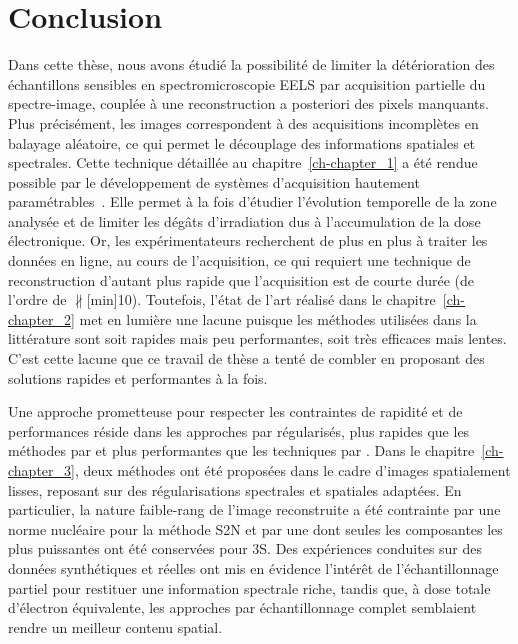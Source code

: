 \chapter*{Conclusion}\label{chap-conclusion}

Dans cette thèse, nous avons étudié la possibilité de limiter la détérioration des échantillons sensibles en spectromicroscopie EELS par acquisition partielle du spectre-image, couplée à une reconstruction a posteriori des pixels manquants. 
%
Plus précisément, les images correspondent à des acquisitions incomplètes en balayage aléatoire, ce qui permet le découplage des informations spatiales et spectrales.
%
Cette technique détaillée au chapitre~\ref{ch-chapter_1} a été rendue possible par le développement de systèmes d'acquisition hautement paramétrables~\cite{tararan2016random, zobelli2019spatial, tence2019following}. Elle permet à la fois d'étudier l'évolution temporelle de la zone analysée et de limiter les dégâts d'irradiation dus à l'accumulation de la dose électronique.
%
Or, les expérimentateurs recherchent de plus en plus à traiter les données en ligne, \ie{} au cours de l'acquisition, ce qui requiert une technique de reconstruction d'autant plus rapide que l'acquisition est de courte durée (de l'ordre de $\nparallel$[min]{10}). Toutefois, l'état de l'art réalisé dans le chapitre~\ref{ch-chapter_2} met en lumière une lacune puisque les méthodes utilisées dans la littérature sont soit rapides mais peu performantes, soit très efficaces mais lentes. C'est cette lacune que ce travail de thèse a tenté de combler en proposant des solutions rapides et performantes à la fois.

Une approche prometteuse pour respecter les contraintes de rapidité et de performances réside dans les approches par  régularisés, plus rapides que les méthodes par  et plus performantes que les techniques par . Dans le chapitre~\ref{ch-chapter_3}, deux méthodes ont été proposées dans le cadre d'images spatialement lisses, reposant sur des régularisations spectrales et spatiales adaptées. 
%
En particulier, la nature faible-rang de l'image reconstruite a été contrainte par une norme nucléaire pour la méthode S2N et par une  dont seules les composantes les plus puissantes ont été conservées pour 3S.
%
Des expériences conduites sur des données synthétiques et réelles ont mis en évidence l'intérêt de l'échantillonnage partiel pour restituer une information spectrale riche, tandis que, à dose totale d'électron équivalente, les approches par échantillonnage complet semblaient rendre un meilleur contenu spatial.

